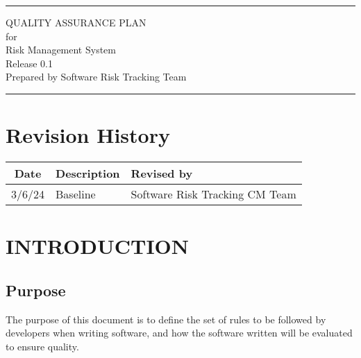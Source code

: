 \documentclass[letterpaper,12pt,oneside,listof=totoc]{scrreprt}
\date{\today}
\author{} %
\def\myversion{0.1}
\begin{document}
\begin{titlepage}
\flushright
\rule{\textwidth}{5pt}\vskip1cm
\Huge{QUALITY ASSURANCE PLAN}\\
\vspace{1.5cm}
for\\
\vspace{1.5cm}
Risk Management System\\
\vspace{1.5cm}
\LARGE{Release 0.1\\}
\vspace{1.5cm}
\vspace{1.5cm}
Prepared by Software Risk Tracking Team\\
\vfill
\rule{\textwidth}{5pt}
\end{titlepage}

\tableofcontents

\listoffigures

\listoftables

\chapter*{Revision History}

\begin{tabular}{| c | p{} | p{} |}
\hline
Date     & Description   & Revised by \\
\hline
3/6/24 & Baseline & Software Risk Tracking CM Team \\
\hline
\end{tabular}

\chapter{INTRODUCTION}
\section{Purpose}
The purpose of this document is to define the set of rules to be followed by developers when writing software, and how the software written will be evaluated to ensure quality.
\end{document}
